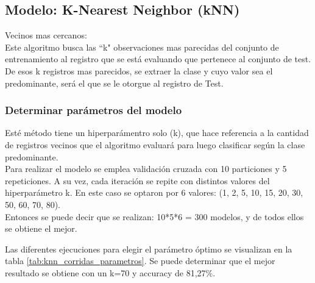 \subsection{Modelo: K-Nearest Neighbor (kNN)}
Vecinos mas cercanos:\\
Este algoritmo busca las ``k" observaciones mas parecidas del conjunto de entrenamiento al registro que se está evaluando que pertenece al conjunto de test. De esos k registros mas parecidos, se extraer la clase y cuyo valor sea el predominante, será el que se le otorgue al registro de Test.


\subsubsection{Determinar parámetros del modelo}
Esté método tiene un hiperparámentro solo (k), que hace referencia a la cantidad de registros vecinos que el algoritmo evaluará para luego clasificar según la clase predominante.\\

Para realizar el modelo se emplea validación cruzada con 10 particiones y 5 repeticiones. A su vez, cada iteración se repite con distintos valores del hiperparámetro k. En este caso se optaron por 6 valores: (1, 2, 5, 10, 15, 20, 30, 50, 60, 70, 80).\\
Entonces se puede decir que se realizan: 10*5*6 = 300 modelos, y de todos ellos se obtiene el mejor.

Las diferentes ejecuciones para elegir el parámetro óptimo se visualizan en la tabla \ref{tab:knn_corridas_parametros}.
Se puede determinar que el mejor resultado se obtiene con un k=70 y accuracy de 81,27\%.


